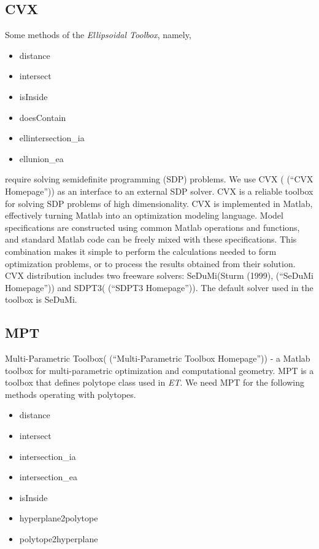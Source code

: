 \documentclass[letterpaper,10pt,english]{sphinxmanual}
\begin{document}
\subsection{CVX}
\label{chap_install:cvx}
Some methods of the \emph{Ellipsoidal Toolbox}, namely,
\begin{itemize}
\item {} 
distance

\item {} 
intersect

\item {} 
isInside

\item {} 
doesContain

\item {} 
ellintersection\_ia

\item {} 
ellunion\_ea

\end{itemize}

require solving semidefinite programming (SDP) problems. We use CVX (
(“CVX Homepage”)) as an interface to an external SDP solver. CVX is a
reliable toolbox for solving SDP problems of high dimensionality. CVX is
implemented in Matlab, effectively turning Matlab into an optimization
modeling language. Model specifications are constructed using common
Matlab operations and functions, and standard Matlab code can be freely
mixed with these specifications. This combination makes it simple to
perform the calculations needed to form optimization problems, or to
process the results obtained from their solution. CVX distribution
includes two freeware solvers: SeDuMi(Sturm (1999), (“SeDuMi Homepage”))
and SDPT3( (“SDPT3 Homepage”)). The default solver used in the toolbox
is SeDuMi.


\subsection{MPT}
\label{chap_install:mpt}
Multi-Parametric Toolbox( (“Multi-Parametric Toolbox Homepage”)) - a
Matlab toolbox for multi-parametric optimization and computational
geometry. MPT is a toolbox that defines polytope class used in \emph{ET}. We
need MPT for the following methods operating with polytopes.
\begin{itemize}
\item {} 
distance

\item {} 
intersect

\item {} 
intersection\_ia

\item {} 
intersection\_ea

\item {} 
isInside

\item {} 
hyperplane2polytope

\item {} 
polytope2hyperplane

\end{itemize}
\end{document}
